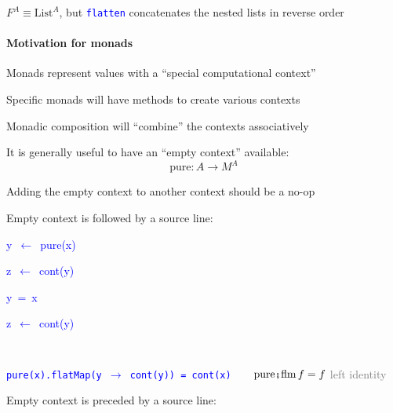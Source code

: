 $F^{A}\equiv\text{List}^{A}$, but \texttt{\textcolor{blue}{\footnotesize{}flatten}}
concatenates the nested lists in reverse order


\paragraph{Motivation for monads}

Monads represent values with a ``special computational context''

Specific monads will have methods to create various contexts

Monadic composition will ``combine'' the contexts associatively

It is generally useful to have an ``empty context'' available:
\[
\text{pure}:A\rightarrow M^{A}
\]

Adding the empty context to another context should be a no-op

Empty context is followed by a source line:

\texttt{\textcolor{blue}{\footnotesize{}}}%
\begin{minipage}[c][1\totalheight][t]{0.49\columnwidth}%
\begin{lyxcode}
\textcolor{blue}{\footnotesize{}y~$\leftarrow$~pure(x)}{\footnotesize\par}

\textcolor{blue}{\footnotesize{}z~$\leftarrow$~cont(y)}{\footnotesize\par}
\end{lyxcode}
%
\end{minipage}\texttt{\textcolor{blue}{\footnotesize{}\hfill{}}}%
\begin{minipage}[c][1\totalheight][t]{0.4\columnwidth}%
\begin{lyxcode}
\textcolor{blue}{\footnotesize{}y~=~x}{\footnotesize\par}

\textcolor{blue}{\footnotesize{}z~$\leftarrow$~cont(y)}{\footnotesize\par}
\end{lyxcode}
%
\end{minipage}\texttt{\textcolor{blue}{\footnotesize{}\hfill{}\medskip{}
}}{\footnotesize\par}

\texttt{\textcolor{blue}{\footnotesize{}pure(x).flatMap(y $\rightarrow$
cont(y)) = cont(x)}}$\quad\quad\text{pure}\bef\text{flm}\,f=f$ \textcolor{gray}{\textendash{}
left identity}

Empty context is preceded by a source line:

